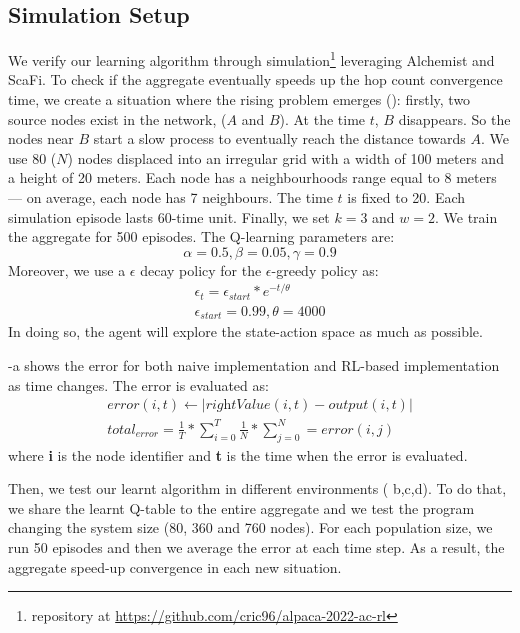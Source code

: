 \documentclass[conference]{IEEEtran}
\begin{document}
\subsection{Simulation Setup}
We verify our learning algorithm through simulation\footnote{repository at \url{https://github.com/cric96/alpaca-2022-ac-rl}} leveraging Alchemist and ScaFi.
 To check if the aggregate eventually speeds up the hop count convergence time, we create a situation where the rising problem emerges ():
 firstly, two source nodes exist in the network, ($A$ and $B$).
 At the time $t$, $B$ disappears. So the nodes near $B$ start a slow process
 to eventually reach the distance towards $A$.
We use 80 ($N$) nodes displaced into an irregular grid with a width of 100 meters and a height of 20 meters. 
 Each node has a neighbourhoods range equal to 8 meters --- on average, each node has 7 neighbours. 
 The time $t$ is fixed to 20.
 Each simulation episode lasts 60-time unit. Finally, we set $k = 3$ and $w = 2$.
% 
We train the aggregate for 500 episodes.
 The Q-learning parameters are:
$$ 
\alpha = 0.5,
\beta = 0.05,
\gamma = 0.9
$$
Moreover, we use a $\epsilon$ decay policy for the $\epsilon$-greedy policy as:
\begin{equation*}
  \begin{array}{l}
    \epsilon_t = \epsilon_{start} * e^{-t/\theta}\\ 
    \epsilon_{start }= 0.99, \theta=4000
  \end{array}
\end{equation*}
In doing so, the agent will explore the state-action space as much as possible.

-a shows the error for both naive implementation and RL-based implementation as time changes.
The error is evaluated as:
\begin{equation*}
  \begin{array}{l}
    error(i, t) \leftarrow  | \textit{rightValue}(i,t) - \textit{output}(i,t) | \\
    total_{error} = \frac{1}{T} * \sum_{i = 0}^T \frac{1}{N} * \sum_{j = 0}^N = error(i, j)
  \end{array}
\end{equation*}
%
where \textbf{i} is the node identifier and \textbf{t} is the time when the error is evaluated.

Then, we test our learnt algorithm in different environments ( b,c,d). To do that, we share the learnt Q-table to the 
 entire aggregate and we test the program changing the system size (80, 360 and 760 nodes).
%
For each population size, we run 50 episodes and then we average the error at each time step. 
 As a result, the aggregate speed-up convergence in each new situation.
\end{document}
